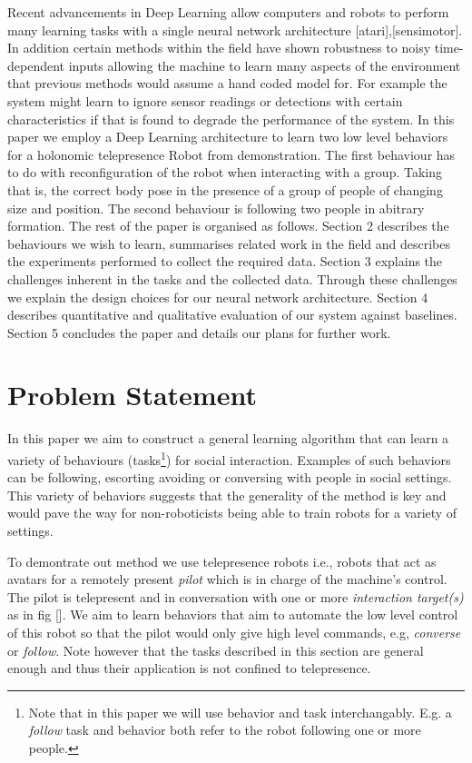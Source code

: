 \documentclass[letterpaper, 10 pt, conference]{ieeeconf}
\begin{document}
 Recent advancements in Deep Learning allow computers and robots to perform many learning tasks with a single neural network architecture [atari],[sensimotor]. In addition certain methods within the field have shown robustness to noisy time-dependent inputs allowing the machine to learn many aspects of the environment that previous methods would assume a hand coded model for. For example the system might learn to ignore sensor readings or detections with certain characteristics if that is found to degrade the performance of the system. In this paper we employ a Deep Learning architecture to learn two low level behaviors for a holonomic telepresence Robot from demonstration. The first behaviour has to do with reconfiguration of the robot when interacting with a group. Taking that is, the correct body pose in the presence of a group of people of changing size and position. The second behaviour is following two people in abitrary formation. The rest of the paper is organised as follows. Section 2 describes the behaviours we wish to learn, summarises related work in the field and describes the experiments performed to collect the required data. Section 3 explains the challenges inherent in the tasks and the collected data. Through these challenges we explain the design choices for our neural network architecture. Section 4 describes quantitative and qualitative evaluation of our system against baselines. Section 5 concludes the paper and details our plans for further work.

\section{Problem Statement \label{sec:related_work}}

In this paper we aim to construct a general learning algorithm that can learn a variety of behaviours (tasks\footnote{Note that in this paper we will use behavior and task interchangably. E.g. a \emph{follow} task and behavior both refer to the robot following one or more people.}) for social interaction. Examples of such behaviors can be following, escorting avoiding or conversing with people in social settings. This variety of behaviors suggests that the generality of the method is key and would pave the way for non-roboticists being able to train robots for a variety of settings. 

To demontrate out method we use telepresence robots  i.e., robots that act as avatars for a remotely present \emph{pilot} which is in charge of the machine's control. The pilot is telepresent and in conversation with one or more \emph{interaction target(s)} as in fig []. We aim to learn behaviors  that aim to automate the low level control of this robot so that the pilot would only give high level commands, e.g, \emph{converse} or \emph{follow}. Note however that the tasks described in this section are general enough and thus their application is not confined to telepresence. 
\end{document}
